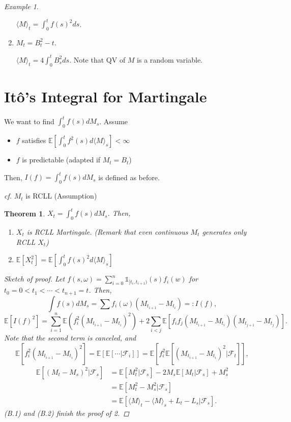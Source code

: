 \documentclass[12pt]{report}
\newcommand{\F}{\mathcal{F}}
\newcommand{\E}{\mathbb{E}}
\renewcommand{\1}{\mathbb{1}}
\theoremstyle{break}
\newtheorem{thm}{Theorem}[section] %
\theoremstyle{newdef}
\theoremstyle{remark}
\newtheorem*{exmp}{Example} %
\begin{document}
\begin{appendices}
\begin{exmp}
\begin{enumerate}
$\langle M \rangle_t = \int_0^t f(s)^2 ds$.

\item $M_t = B_t^2 - t$.

$\langle M \rangle_t = 4 \int_0^t B_s^2ds$.
Note that QV of $M$ is a random variable.
\end{enumerate}
\end{exmp}


\section{It\^o's Integral for Martingale}
We want to find $\int_0^t f(s)dM_s$.
Assume
\begin{itemize}
\item 
$f$ satisfies $\E[\int_0^t f^2(s) d\langle M\rangle_s] < \infty$

\item 
$f$ is predictable (adapted if $M_t = B_t$)
\end{itemize}
Then, $I(f) = \int_0^t f(s) dM_s$ is defined as before.

\textit{cf.} $M_t$ is RCLL (Assumption)

\begin{thm}
$X_t = \int_0^t f(s)dM_s$. Then,
\begin{enumerate}
\item
$X_t$ is RCLL Martingale.
(Remark that even continuous $M_t$ generates only RCLL $X_t$)

\item
$\E[X_t^2] = \E[\int_0^t f(s)^2 d\langle M \rangle_s]$
\end{enumerate}

\begin{proof}[Sketch of proof]
Let $f(s,\omega) = \sum_{i=0}^n \1_{[t_i, t_{i+1})}(s) f_i(w)$ for $t_0 = 0 < t_1 < \cdots < t_{n+1} = t$.
Then,
\[\int f(s)dM_s = \sum f_i(\omega)\left(M_{t_{i+1}} - M_{t_i}\right) =: I(f),\]
\[\E[I(f)^2] = \sum_{i=1}^n \E\left(f_i^2(M_{t_{i+1}} - M_{t_i})^2\right) + 2\sum_{i < j} \E\left[f_if_j(M_{t_{i+1}} - M_{t_i})(M_{t_{j+1}}-M_{t_j})\right].\]
Note that the second term is canceled, and
\begin{equation}\E[f_i^2(M_{t_{i+1}} - M_{t_i})^2] = \E[\E[\cdots|\F_i]] = \E[f_i^2\E[(M_{t_{i+1}} - M_{t_i})^2 | \F_t]],\end{equation}
\begin{equation}
\begin{aligned}
\E[(M_t - M_s)^2 | \F_s]
&= \E[M_t^2 | \F_s] - 2M_s \E[M_t | \F_s] + M_s^2\\
&= \E[M_t^2 - M_s^2 | \F_s]\\
&= \E[\langle M \rangle_t - \langle M \rangle_s + L_t - L_s | \F_s].
\end{aligned}
\end{equation}
(B.1) and (B.2) finish the proof of 2.
\end{proof}
\end{thm}



\end{appendices}
\end{document}
